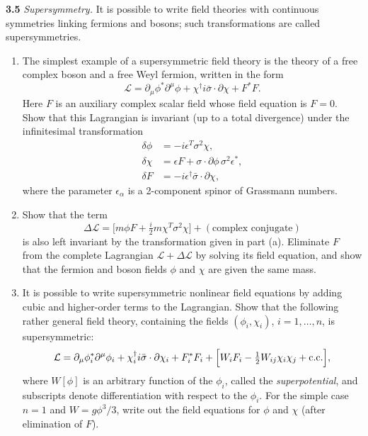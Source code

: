 \textbf{3.5} \emph{Supersymmetry.}  It is possible to write field theories
with continuous symmetries linking fermions and bosons; such transformations
are called supersymmetries.
\begin{enumerate}[label=(\alph*)]
  \item The simplest example of a supersymmetric field theory is the theory
    of a free complex boson and a free Weyl fermion, written in the form
    \begin{equation}
      \mathcal{L} = \partial_\mu\phi^{*}\partial^\mu\phi
        + \chi^{\dagger}i\bar{\sigma}\cdot\partial\chi + F^{*}F .
    \end{equation}
    Here $F$ is an auxiliary complex scalar field whose field equation is
    $F = 0$.  Show that this Lagrangian is invariant (up to a total
    divergence) under the infinitesimal transformation
    \begin{align}
      \delta\phi &= -i\epsilon^T\sigma^2\chi,\\
      \delta\chi &= \epsilon F + \sigma\cdot\partial\phi\,\sigma^2\epsilon^{*},\\
      \delta F &= -i\epsilon^{\dagger}\bar{\sigma}\cdot\partial\chi,
    \end{align}
    where the parameter $\epsilon_\alpha$ is a 2-component spinor of
    Grassmann numbers.
  \item Show that the term
    \begin{equation}
      \Delta\mathcal{L} = \bigl[ m\phi F + \tfrac{i}{2}m\chi^T\sigma^2\chi \bigr]
        + (\text{complex conjugate})
    \end{equation}
    is also left invariant by the transformation given in part (a).
    Eliminate $F$ from the complete Lagrangian $\mathcal{L} +
    \Delta\mathcal{L}$ by solving its field equation, and show that the
    fermion and boson fields $\phi$ and $\chi$ are given the same mass.
  \item It is possible to write supersymmetric nonlinear field equations by
    adding cubic and higher-order terms to the Lagrangian.  Show that the
    following rather general field theory, containing the fields
    $(\phi_i, \chi_i)$, $i = 1, \ldots, n$, is supersymmetric:
    \begin{equation}
      \mathcal{L} = \partial_\mu\phi_i^{*}\partial^\mu\phi_i
        + \chi_i^{\dagger}i\bar{\sigma}\cdot\partial\chi_i + F_i^{*}F_i
        + \Bigl[ W_i F_i - \tfrac{1}{2}W_{ij}\chi_i\chi_j + \text{c.c.}
          \Bigr],
    \end{equation}
    where $W[\phi]$ is an arbitrary function of the $\phi_i$, called the
    \emph{superpotential}, and subscripts denote differentiation with respect
    to the $\phi_i$.  For the simple case $n = 1$ and $W = g\phi^3/3$, write
    out the field equations for $\phi$ and $\chi$ (after elimination of
    $F$).
\end{enumerate}

